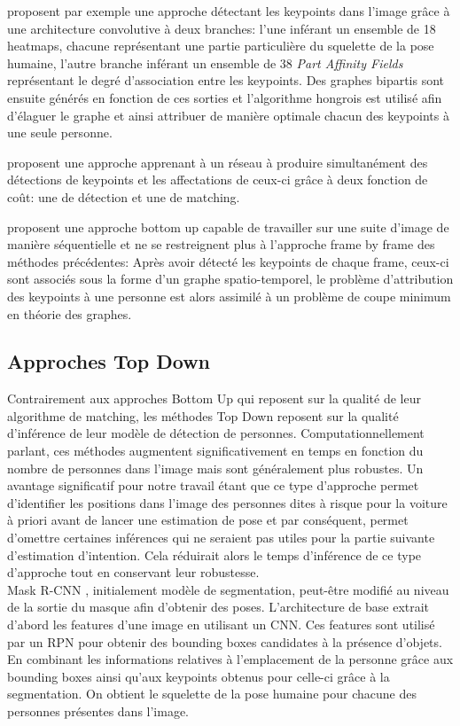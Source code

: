 \cite{cao2017realtime} proposent par exemple une approche détectant les keypoints dans l'image grâce à une architecture convolutive à deux branches: l'une inférant un ensemble de 18 heatmaps, chacune représentant une partie particulière du squelette de la pose humaine, l'autre branche inférant un ensemble de 38 \textit{Part Affinity Fields} représentant le degré d'association entre les keypoints. Des graphes bipartis sont ensuite générés en fonction de ces sorties et l'algorithme hongrois est utilisé afin d'élaguer le graphe et ainsi attribuer de manière optimale chacun des keypoints à une seule personne.

\cite{627f7b8a4a3441f28d400cfbd7a32b80} proposent une approche apprenant à un réseau à produire simultanément des détections de keypoints et les affectations de ceux-ci grâce à deux fonction de coût: une de détection et une de matching.

\cite{DBLP:journals/corr/InsafutdinovAPT16} proposent une approche bottom up capable de travailler sur une suite d'image de manière séquentielle et ne se restreignent plus à l'approche frame by frame des méthodes précédentes: Après avoir détecté les keypoints de chaque frame, ceux-ci sont associés sous la forme d'un graphe spatio-temporel, le problème d'attribution des keypoints à une personne est alors assimilé à un problème de coupe minimum en théorie des graphes.

\subsection{Approches Top Down}
Contrairement aux approches Bottom Up qui reposent sur la qualité de leur algorithme de matching, les méthodes Top Down reposent sur la qualité d'inférence de leur modèle de détection de personnes. Computationnellement parlant, ces méthodes augmentent significativement en temps en fonction du nombre de personnes dans l'image mais sont généralement plus robustes. Un avantage significatif pour notre travail étant que ce type d'approche permet d'identifier les positions dans l'image des personnes dites à risque pour la voiture à priori avant de lancer une estimation de pose et par conséquent, permet d'omettre certaines inférences qui ne seraient pas utiles pour la partie suivante d'estimation d'intention. Cela réduirait alors le temps d'inférence de ce type d'approche tout en conservant leur robustesse.\\

Mask R-CNN \cite{2017arXiv170306870H}, initialement modèle de segmentation, peut-être modifié au niveau de la sortie du masque afin d'obtenir des poses. L'architecture de base extrait d'abord les features d'une image en utilisant un CNN. Ces features sont utilisé par un RPN pour obtenir des bounding boxes candidates à la présence d'objets. En combinant les informations relatives à l'emplacement de la personne grâce aux bounding boxes ainsi qu'aux keypoints obtenus pour celle-ci grâce à la segmentation. On obtient le squelette de la pose humaine pour chacune des personnes présentes dans l'image.



